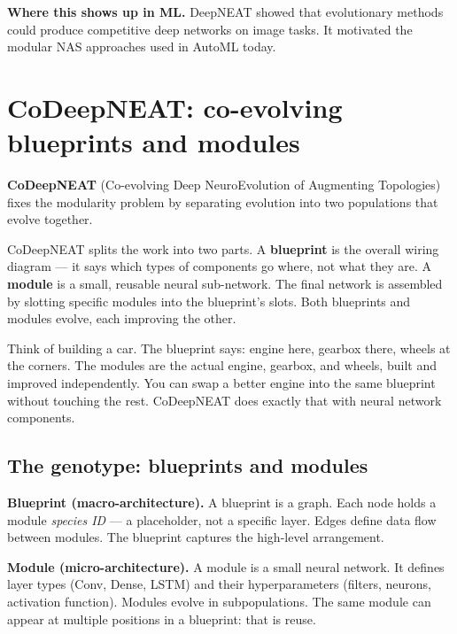 \documentclass[a4paper,11pt]{article}
\newcommand{\vocab}[1]{\textbf{\color{navy}#1}}
\begin{document}
\textbf{Where this shows up in ML.}
DeepNEAT showed that evolutionary methods could produce competitive deep
networks on image tasks.
It motivated the modular NAS approaches used in AutoML today.

\section{CoDeepNEAT: co-evolving blueprints and modules}

\vocab{CoDeepNEAT} (Co-evolving Deep NeuroEvolution of Augmenting
Topologies) fixes the modularity problem by separating evolution into
two populations that evolve together.

\begin{intuition}
CoDeepNEAT splits the work into two parts.
A \vocab{blueprint} is the overall wiring diagram --- it says which
types of components go where, not what they are.
A \vocab{module} is a small, reusable neural sub-network.
The final network is assembled by slotting specific modules into the
blueprint's slots.
Both blueprints and modules evolve, each improving the other.
\end{intuition}

\begin{everyday}
Think of building a car.
The blueprint says: engine here, gearbox there, wheels at the corners.
The modules are the actual engine, gearbox, and wheels, built and
improved independently.
You can swap a better engine into the same blueprint without touching
the rest.
CoDeepNEAT does exactly that with neural network components.
\end{everyday}

\subsection{The genotype: blueprints and modules}

\noindent\textbf{Blueprint (macro-architecture).}
A blueprint is a graph.
Each node holds a module \emph{species ID} --- a placeholder, not a
specific layer.
Edges define data flow between modules.
The blueprint captures the high-level arrangement.

\noindent\textbf{Module (micro-architecture).}
A module is a small neural network.
It defines layer types (Conv, Dense, LSTM) and their hyperparameters
(filters, neurons, activation function).
Modules evolve in subpopulations.
The same module can appear at multiple positions in a blueprint: that
is reuse.
\end{document}
